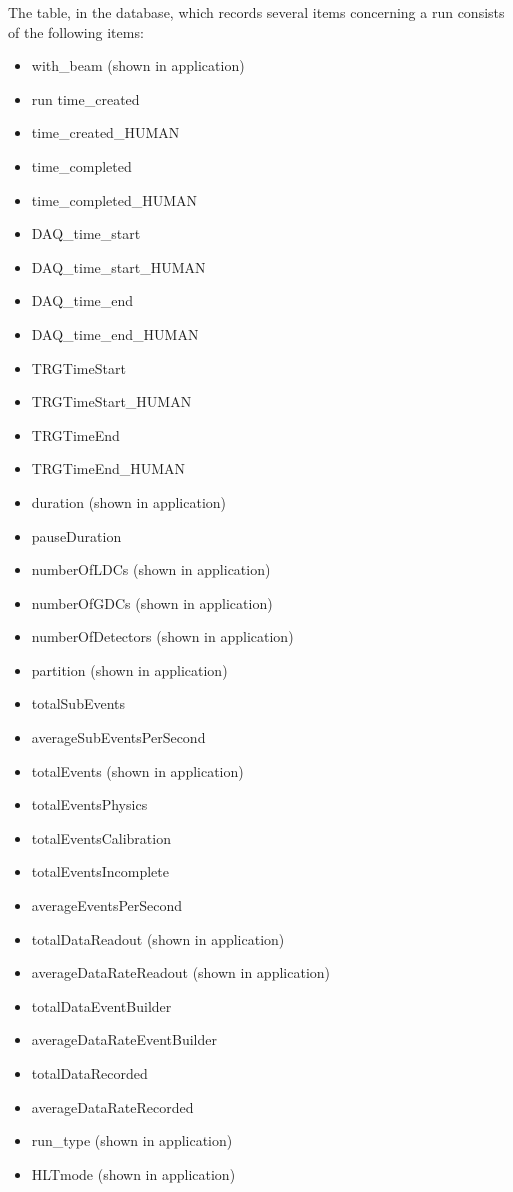 The table, in the database, which records several items concerning a run consists of the following items:
\begin{itemize}
  \item with\_beam	(shown in application)
  \item run	time\_created	
  \item time\_created\_HUMAN	
  \item time\_completed	
  \item time\_completed\_HUMAN	
  \item DAQ\_time\_start	
  \item DAQ\_time\_start\_HUMAN	
  \item DAQ\_time\_end	
  \item DAQ\_time\_end\_HUMAN	
  \item TRGTimeStart	
  \item TRGTimeStart\_HUMAN	
  \item TRGTimeEnd	
  \item TRGTimeEnd\_HUMAN	
  \item duration (shown in application)
  \item pauseDuration	
  \item numberOfLDCs (shown in application)
  \item numberOfGDCs (shown in application)
  \item numberOfDetectors (shown in application)
  \item partition (shown in application)
  \item totalSubEvents	
  \item averageSubEventsPerSecond	
  \item totalEvents (shown in application)
  \item totalEventsPhysics	
  \item totalEventsCalibration	
  \item totalEventsIncomplete	
  \item averageEventsPerSecond	
  \item totalDataReadout (shown in application)
  \item averageDataRateReadout (shown in application)
  \item totalDataEventBuilder	
  \item averageDataRateEventBuilder	
  \item totalDataRecorded	
  \item averageDataRateRecorded	
  \item run\_type (shown in application)
  \item HLTmode (shown in application)

\end{itemize}
